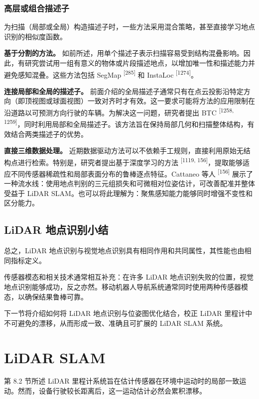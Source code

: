 \subsubsection{高层或组合描述子}

为扫描（局部或全局）构造描述子时，一些方法采用混合策略，甚至直接学习地点识别的相似度函数。

\textbf{基于分割的方法。} 如前所述，用单个描述子表示扫描容易受到结构混叠影响。因此，有研究尝试用一组有意义的物体或片段描述地点，以增加唯一性和描述能力并避免感知混叠。这些方法包括 SegMap \textsuperscript{[285]} 和 InstaLoc \textsuperscript{[1274]}。

\textbf{连接局部和全局的描述子。} 前面介绍的全局描述子通常只有在点云投影沿特定方向（即顶视图或球面视图）一致对齐时才有效。这一要求可能将方法的应用限制在沿道路以可预测方向行驶的车辆。为解决这一问题，研究者提出 BTC \textsuperscript{[1258, 1259]}，同时利用局部和全局描述子。该方法旨在保持局部几何和扫描整体结构，有效结合两类描述子的优势。

\textbf{直接三维数据处理。} 近期数据驱动方法可以不依赖手工规则，直接利用原始无结构点进行检索。特别是，研究者提出基于深度学习的方法 \textsuperscript{[1119, 156]}，提取能够适应不同传感器稀疏性和局部表面分布的鲁棒逐点特征。Cattaneo 等人 \textsuperscript{[156]} 展示了一种流水线：使用地点判别的三元组损失和可微相对位姿估计，可改善配准并整体受益于 LiDAR SLAM。也可以将此理解为：聚焦感知能力能够同时增强不变性和区分能力。

\subsection{LiDAR 地点识别小结}

总之，LiDAR 地点识别与视觉地点识别具有相同作用和共同属性，其性能也由相同指标定义。

传感器模态和相关技术通常相互补充：在许多 LiDAR 地点识别失败的位置，视觉地点识别能够成功，反之亦然。移动机器人导航系统通常同时使用两种传感器模态，以确保结果鲁棒可靠。

下一节将介绍如何将 LiDAR 地点识别与位姿图优化结合，校正 LiDAR 里程计中不可避免的漂移，从而形成一致、准确且可扩展的 LiDAR SLAM 系统。

\section{LiDAR SLAM}

第 8.2 节所述 LiDAR 里程计系统旨在估计传感器在环境中运动时的局部一致运动。然而，设备行驶较长距离后，这一运动估计必然会累积漂移。

